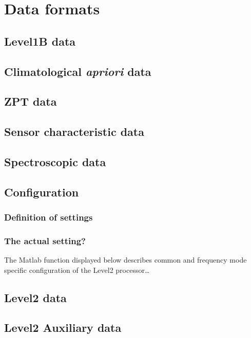 
\chapter{Data formats}
\label{sec:dataformat}


\section{Level1B data}
\section{Climatological \textit{apriori} data}
\section{ZPT data}
\section{Sensor characteristic data}
\section{Spectroscopic data}
\section{Configuration}

\subsection{Definition of settings}

\subsection{The actual setting?}
The Matlab function displayed below describes common
and frequency mode specific configuration of
the Level2 processor\dots{}\


\section{Level2 data}
\section{Level2 Auxiliary data}


